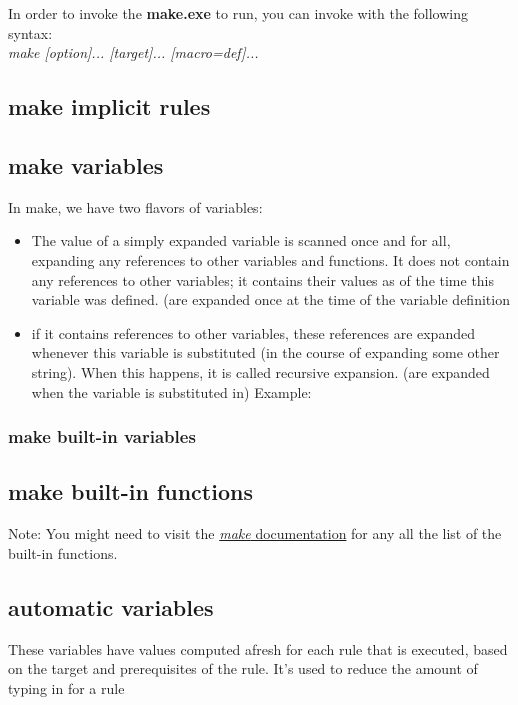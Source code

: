 \documentclass{article}
\begin{document}
In order to invoke the \textbf{make.exe} to run, you can invoke with the following syntax:\\
\textit{make [option]... [target]... [macro=def]...}

\subsection{make implicit rules}

\subsection{make variables}
In make, we have two flavors of variables:
\begin{itemize}
    \item The value of a simply expanded variable is scanned once and for all, expanding any references to other variables and functions. It does not contain any references to other variables; it contains their values as of the time this variable was defined. (are expanded once at the time of the variable definition
    \item if it contains references to other variables, these references are expanded whenever this variable is substituted (in the course of expanding some other string). When this happens, it is called recursive expansion. (are expanded when the variable is substituted in)
Example:


\end{itemize}

\subsubsection{make built-in variables}

\subsection{make built-in functions}

Note: You might need to visit the \href{https://www.gnu.org/software/make/manual/html_node/Functions.html}{\textit{make} documentation} for any all the list of the built-in functions.

\subsection{automatic variables}
These variables have values computed afresh for each rule that is executed, based on the target and prerequisites of the rule. It’s used to reduce the amount of typing in for a rule

\end{document}
